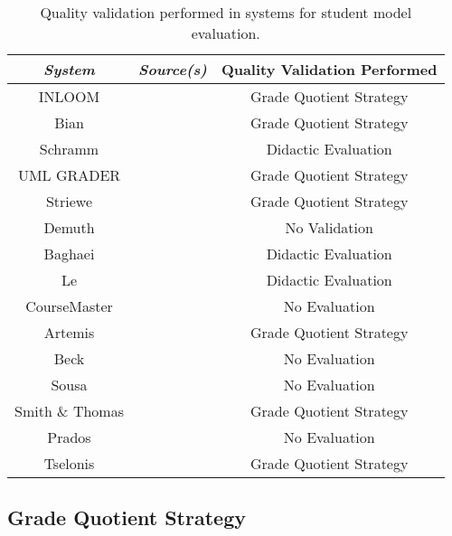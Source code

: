 \begin{center}
    \begin{table}
        \label{table:ExistingSystemsTable}
        \caption{Quality validation performed in systems for student model evaluation.}
        \begin{tabular}{c|c|c}
            \textit{System} & \textit{Source(s)}    & Quality Validation Performed\\
            \hline
            INLOOM          & \cite{1}              & Grade Quotient Strategy\\
            Bian            & \cite{6, 7}           & Grade Quotient Strategy\\
            Schramm         & \cite{23}             & Didactic Evaluation\\
            UML GRADER      & \cite{8}              & Grade Quotient Strategy\\
            Striewe         & \cite{16}             & Grade Quotient Strategy\\
            Demuth          & \cite{9}              & No Validation\\
            Baghaei         & \cite{10}             & Didactic Evaluation\\
            Le              & \cite{24}             & Didactic Evaluation\\
            CourseMaster    & \cite{11, 26}         & No Evaluation \\
            Artemis         & \cite{17, 22}         & Grade Quotient Strategy\\
            Beck            & \cite{12}             & No Evaluation \\
            Sousa           & \cite{13}             & No Evaluation \\
            Smith \& Thomas & \cite{18, 27, 28}     & Grade Quotient Strategy\\
            Prados          & \cite{14}             & No Evaluation\\
            Tselonis        & \cite{19}             & Grade Quotient Strategy\\
        \end{tabular}
    \end{table}
\end{center}


\pagebreak
\subsection{Grade Quotient Strategy}

